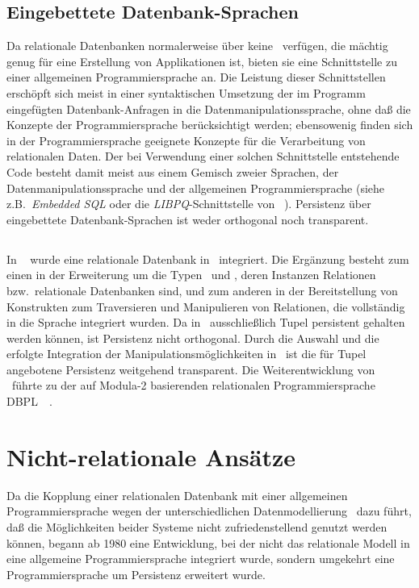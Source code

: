 \subsection{Eingebettete Datenbank-Sprachen}
%
Da relationale Datenbanken normalerweise \"{u}ber keine
\ ver\-f\"{u}\-gen, die m\"{a}chtig
genug f\"{u}r eine Erstellung von Applikationen ist, bieten sie eine
Schnittstelle zu einer allgemeinen Programmiersprache an. Die Leistung
dieser Schnittstellen ersch\"{o}pft sich meist in einer syntaktischen
Umsetzung der im Programm eingef\"{u}gten Datenbank-Anfragen in die
Datenmanipulationssprache, ohne da\ss{} die Konzepte der
Programmiersprache ber\"{u}cksichtigt werden; ebensowenig finden sich in
der Programmiersprache geeignete Konzepte f\"{u}r die Verarbeitung von
relationalen Daten. Der bei Verwendung einer solchen Schnittstelle
entstehende Code besteht damit meist aus einem Gemisch zweier
Sprachen, der Datenmanipulationssprache und der allgemeinen
Programmiersprache (siehe z.B.\ {\em Embedded SQL\/}
\cite[]{bib:on94} oder die
{\em LIBPQ\/}-Schnittstelle von
\postgres\ \cite[]{bib:we93}). Persistenz \"{u}ber
eingebettete Datenbank-Sprachen ist weder orthogonal noch transparent.
%
\subsection{\protect\pascalr}
%
In \pascalr\ \cite{bib:schm80} \cite{bib:schm77}
\cite[]{bib:cl91} wurde 
eine relationale Datenbank in \pascal\ integriert. Die Erg\"{a}nzung
besteht zum einen in der Erweiterung um die Typen
\ und , deren Instanzen Relationen
bzw.\ relationale Datenbanken sind, und zum anderen in der
Bereitstellung von Konstrukten zum Traversieren und Manipulieren von
Relationen, die vollst\"{a}ndig in die Sprache integriert wurden. Da in
\pascalr\ ausschlie\ss{}lich Tupel persistent gehalten werden k\"{o}nnen,
ist Persistenz nicht orthogonal.  Durch die Auswahl und die erfolgte
Integration der Manipulationsm\"{o}glichkeiten in \pascal\ ist die f\"{u}r
Tupel angebotene Persistenz weitgehend transparent. Die
Weiterentwicklung von \pascalr\ f\"{u}hrte zu der auf Modula-2
basierenden relationalen Programmiersprache
\mbox{DBPL}\ \cite{bib:ma92a}\ \cite{bib:ma92b}.
%
\section{Nicht-relationale Ans\"{a}tze}
%
Da die Kopplung einer relationalen Datenbank mit einer allgemeinen
Programmiersprache wegen der unterschiedlichen Datenmodellierung
\ia\ dazu f\"{u}hrt, da\ss{} die M\"{o}glichkeiten beider Systeme nicht
zufriedenstellend genutzt werden k\"{o}nnen, begann ab 1980 eine
Entwicklung, bei der nicht das relationale Modell in
eine allgemeine Programmiersprache integriert wurde, sondern umgekehrt
eine Programmiersprache um Persistenz erweitert wurde.
%
